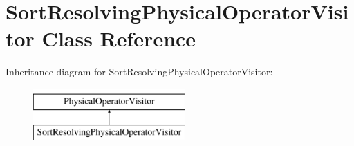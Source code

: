 \hypertarget{class_sort_resolving_physical_operator_visitor}{\section{Sort\+Resolving\+Physical\+Operator\+Visitor Class Reference}
\label{class_sort_resolving_physical_operator_visitor}
}
Inheritance diagram for Sort\+Resolving\+Physical\+Operator\+Visitor\+:\begin{figure}[H]
\begin{center}
\leavevmode
\includegraphics[height=2.000000cm]{class_sort_resolving_physical_operator_visitor}
\end{center}
\end{figure}
